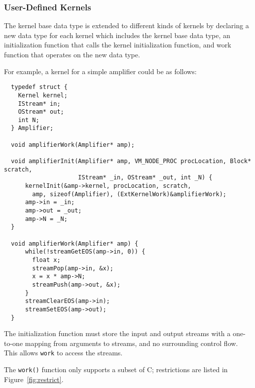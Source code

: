 \subsubsection{User-Defined Kernels}
\label{sec:kernelhlc}

The kernel base data type is extended to different kinds of 
kernels by declaring a new data type for each kernel 
which includes the kernel base data type,
an initialization function that calls the kernel 
initialization function, and work function that 
operates on the new data type. 

For example, a kernel for a simple amplifier could be as follows:

{\small
\begin{verbatim}
  typedef struct {
    Kernel kernel;
    IStream* in;
    OStream* out;
    int N;
  } Amplifier;

  void amplifierWork(Amplifier* amp);

  void amplifierInit(Amplifier* amp, VM_NODE_PROC procLocation, Block* scratch, 
                     IStream* _in, OStream* _out, int _N) {
      kernelInit(&amp->kernel, procLocation, scratch, 
        amp, sizeof(Amplifier), (ExtKernelWork)&amplifierWork);
      amp->in = _in;
      amp->out = _out;
      amp->N = _N;
  }

  void amplifierWork(Amplifier* amp) {
      while(!streamGetEOS(amp->in, 0)) {
        float x;
        streamPop(amp->in, &x);
        x = x * amp->N;
        streamPush(amp->out, &x);
      }
      streamClearEOS(amp->in);
      streamSetEOS(amp->out);
  }
\end{verbatim}}


The initialization function must store the input and output streams with a one-to-one mapping from arguments to streams, and no surrounding control flow.  This allows {\tt work} to access the streams.

The {\tt work()} function only supports a subset of C; restrictions are listed in Figure~\ref{fig:restrict}.  

